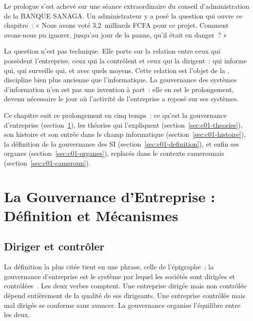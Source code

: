 Le prologue s'est achevé sur une séance extraordinaire du conseil
d'administration de la BANQUE SANAGA. Un administrateur y a posé la
question qui ouvre ce chapitre~: « Nous avons voté 3,2~milliards FCFA pour
ce projet. Comment avons-nous pu ignorer, jusqu'au jour de la panne, qu'il
était en danger~? »

La question n'est pas technique. Elle porte sur la relation entre ceux qui
possèdent l'entreprise, ceux qui la contrôlent et ceux qui la dirigent~:
qui informe qui, qui surveille qui, et avec quels moyens. Cette relation
est l'objet de la , discipline bien plus
ancienne que l'informatique. La gouvernance des systèmes d'information n'en
est pas une invention à part~: elle en est le prolongement, devenu
nécessaire le jour où l'activité de l'entreprise a reposé sur ses systèmes.

Ce chapitre suit ce prolongement en cinq temps~: ce qu'est la gouvernance
d'entreprise (section~\ref{sec:c01-gouv-ent}), les théories qui
l'expliquent (section~\ref{sec:c01-theories}), son histoire et son entrée
dans le champ informatique (section~\ref{sec:c01-histoire}), la définition
de la gouvernance des SI (section~\ref{sec:c01-definition}), et enfin ses
organes (section~\ref{sec:c01-organes}), replacés dans le contexte
camerounais (section~\ref{sec:c01-cameroun}).

\separateur

\section{La Gouvernance d'Entreprise : Définition et Mécanismes}
\label{sec:c01-gouv-ent}

\subsection{Diriger et contrôler}

La définition la plus citée tient en une phrase, celle de l'épigraphe~: la
gouvernance d'entreprise est le système par lequel les sociétés sont
dirigées et contrôlées~\cite{cadbury1992}. Les deux verbes comptent. Une
entreprise dirigée mais non contrôlée dépend entièrement de la qualité de
ses dirigeants. Une entreprise contrôlée mais mal dirigée se conforme sans
avancer. La gouvernance organise l'équilibre entre les deux.

